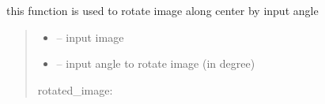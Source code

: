 \documentclass[letterpaper,10pt,english]{sphinxmanual}
\begin{document}
\begin{savenotes}\begin{fulllineitems}
\label{\detokenize{setting/backend/camera_funcs:oxin.backend.camera_funcs.rotate_calibration_image}}
\pysigstartsignatures
{}
\pysigstopsignatures
\sphinxAtStartPar
this function is used to rotate image along center by input angle
\begin{quote}\begin{description}
\begin{itemize}
\item {} 
\sphinxAtStartPar
{} – input image

\item {} 
\sphinxAtStartPar
{} – input angle to rotate image (in degree)

\end{itemize}

\sphinxAtStartPar
rotated\_image:

\end{description}\end{quote}

\end{fulllineitems}\end{savenotes}

\end{document}
